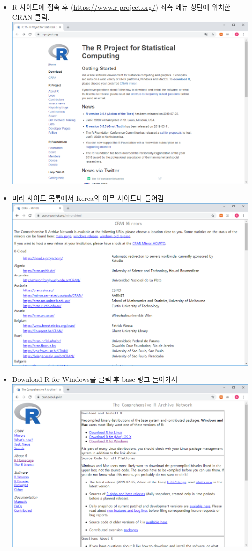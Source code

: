 \documentclass[
]{book}
\begin{document}
\begin{itemize}
\item
  R 사이트에 접속 후 (\url{https://www.r-project.org/}) 좌측 메뉴 상단에 위치한 CRAN 클릭.
  \includegraphics{images/01/01-01.PNG}
\item
  미러 사이트 목록에서 Korea의 아무 사이트나 들어감
  \includegraphics{images/01/01-02.PNG}
\item
  Download R for Windows를 클릭 후 base 링크 들어가서
  \includegraphics{images/01/01-03.PNG}\\

\end{itemize}
\end{document}
